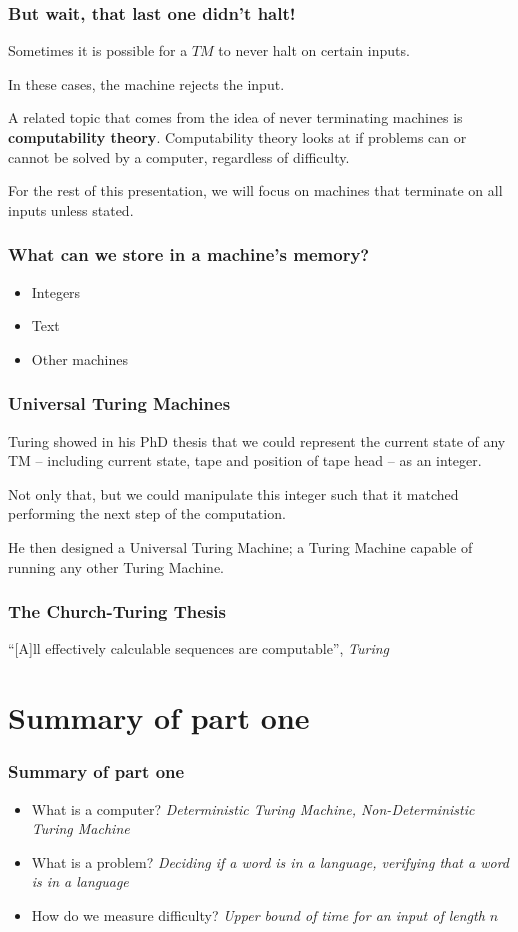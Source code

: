 \documentclass[aspectratio=169]{beamer}
\begin{document}
\begin{frame}
\frametitle{But wait, that last one didn't halt!}
Sometimes it is possible for a $TM$ to never halt on certain inputs.

In these cases, the machine rejects the input.

A related topic that comes from the idea of never terminating machines is {\bf computability theory}. Computability theory looks at if problems can or cannot be solved by a computer, regardless of difficulty.

For the rest of this presentation, we will focus on machines that terminate on all inputs unless stated.
\end{frame}

\begin{frame}
\frametitle{What can we store in a machine's memory?}
\begin{itemize}
	\item Integers
	\item Text
	\item Other machines
\end{itemize}
\end{frame}

\begin{frame}
\frametitle{Universal Turing Machines}
Turing showed in his PhD thesis that we could represent the current state of any TM -- including current state, tape and position of tape head -- as an integer.

Not only that, but we could manipulate this integer such that it matched performing the next step of the computation.

He then designed a Universal Turing Machine; a Turing Machine capable of running any other Turing Machine.
\end{frame}

\begin{frame}
\frametitle{The Church-Turing Thesis}
\centerline{``[A]ll effectively calculable sequences are computable'', {\em Turing}}
\end{frame}

\section{Summary of part one}

\begin{frame}
\frametitle{Summary of part one}
\begin{itemize}
    \item What is a computer? {\em Deterministic Turing Machine, Non-Deterministic Turing Machine}
    \item What is a problem? {\em Deciding if a word is in a language, verifying that a word is in a language}
    \item How do we measure difficulty? {\em Upper bound of time for an input of length $n$}
\end{itemize}
\end{frame}
\end{document}
